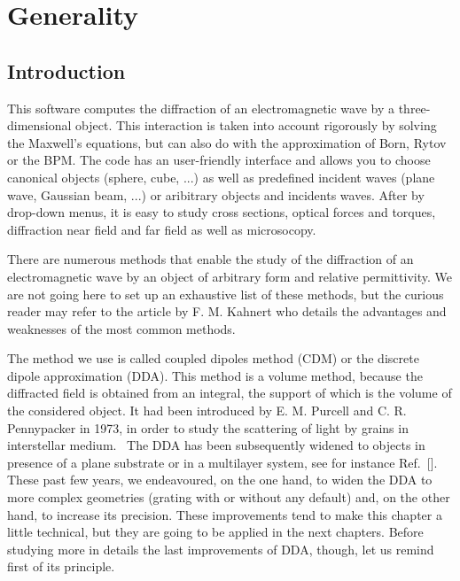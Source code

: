 \chapter{Generality}\label{chap1}

\minitoc

\section{Introduction}


This software computes the diffraction of an electromagnetic wave by a
three-dimensional object. This interaction is taken into account
rigorously by solving the Maxwell's equations, but can also do with
the approximation of Born, Rytov or the BPM. The code has an
user-friendly interface and allows you to choose canonical objects
(sphere, cube, ...) as well as predefined incident waves (plane wave,
Gaussian beam, ...) or aribitrary objects and incidents waves. After
by drop-down menus, it is easy to study cross sections, optical forces
and torques, diffraction near field and far field as well as
microsocopy.


There are numerous methods that enable the study of the diffraction of
an electromagnetic wave by an object of arbitrary form and relative
permittivity. We are not going here to set up an exhaustive list of
these methods, but the curious reader may refer to the article by
F. M. Kahnert who details the advantages and weaknesses of the most
common methods.~\cite{Kahnert_JQSRT_03} 

The method we use is called coupled dipoles method (CDM) or the
discrete dipole approximation (DDA). This method is a volume method,
because the diffracted field is obtained from an integral, the support
of which is the volume of the considered object.  It had been
introduced by E. M. Purcell and C. R. Pennypacker in 1973, in order to
study the scattering of light by grains in interstellar
medium.~\cite{Purcell_AJ_73} The DDA has been subsequently widened to
objects in presence of a plane substrate or in a multilayer system,
see for instance Ref.~[]. These past few
years, we endeavoured, on the one hand, to widen the DDA to more
complex geometries (grating with or without any default) and, on the
other hand, to increase its precision.  These improvements tend to
make this chapter a little technical, but they are going to be applied
in the next chapters. Before studying more in details the last
improvements of DDA, though, let us remind first of its principle.

